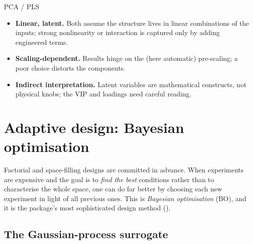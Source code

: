 \begin{consbox}{PCA / PLS}
\begin{itemize}
  \item \textbf{Linear, latent.} Both assume the structure lives in linear
  combinations of the inputs; strong nonlinearity or interaction is captured only
  by adding engineered terms.
  \item \textbf{Scaling-dependent.} Results hinge on the (here automatic)
  pre-scaling; a poor choice distorts the components.
  \item \textbf{Indirect interpretation.} Latent variables are mathematical
  constructs, not physical knobs; the VIP and loadings need careful reading.
\end{itemize}
\end{consbox}

\section{Adaptive design: Bayesian optimisation}
\label{sec:bo}

Factorial and space-filling designs are committed in advance. When experiments
are expensive and the goal is to \emph{find the best} conditions rather than to
characterise the whole space, one can do far better by choosing each new
experiment in light of all previous ones. This is \emph{Bayesian optimisation}
(BO), and it is the package's most sophisticated design method
().

\subsection{The Gaussian-process surrogate}

